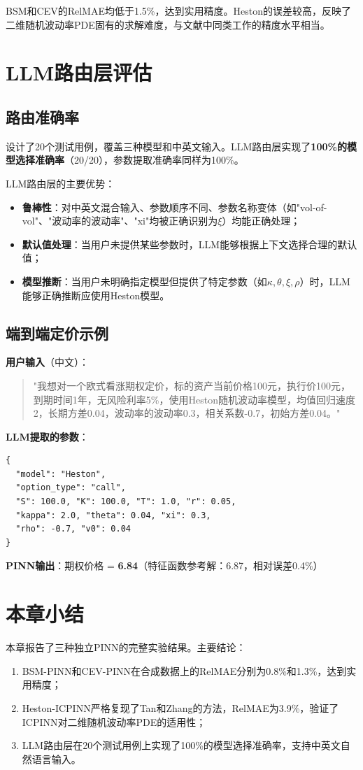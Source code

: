 BSM和CEV的RelMAE均低于1.5\%，达到实用精度。Heston的误差较高，反映了二维随机波动率PDE固有的求解难度，与文献中同类工作的精度水平相当。

\section{LLM路由层评估}\label{sec:llm_eval}

\subsection{路由准确率}

设计了20个测试用例，覆盖三种模型和中英文输入。LLM路由层实现了\textbf{100\%的模型选择准确率}（20/20），参数提取准确率同样为100\%。

LLM路由层的主要优势：
\begin{itemize}
  \item \textbf{鲁棒性}：对中英文混合输入、参数顺序不同、参数名称变体（如"vol-of-vol"、"波动率的波动率"、"xi"均被正确识别为$\xi$）均能正确处理；
  \item \textbf{默认值处理}：当用户未提供某些参数时，LLM能够根据上下文选择合理的默认值；
  \item \textbf{模型推断}：当用户未明确指定模型但提供了特定参数（如$\kappa,\theta,\xi,\rho$）时，LLM能够正确推断应使用Heston模型。
\end{itemize}

\subsection{端到端定价示例}

\textbf{用户输入}（中文）：
\begin{quote}
"我想对一个欧式看涨期权定价，标的资产当前价格100元，执行价100元，到期时间1年，无风险利率5\%，使用Heston随机波动率模型，均值回归速度2，长期方差0.04，波动率的波动率0.3，相关系数-0.7，初始方差0.04。"
\end{quote}

\textbf{LLM提取的参数}：
\begin{verbatim}
{
  "model": "Heston",
  "option_type": "call",
  "S": 100.0, "K": 100.0, "T": 1.0, "r": 0.05,
  "kappa": 2.0, "theta": 0.04, "xi": 0.3,
  "rho": -0.7, "v0": 0.04
}
\end{verbatim}

\textbf{PINN输出}：期权价格 = \textbf{6.84}（特征函数参考解：6.87，相对误差0.4\%）

\section{本章小结}\label{sec:exp_summary}

本章报告了三种独立PINN的完整实验结果。主要结论：
\begin{enumerate}
  \item BSM-PINN和CEV-PINN在合成数据上的RelMAE分别为0.8\%和1.3\%，达到实用精度；
  \item Heston-ICPINN严格复现了Tan和Zhang\citep{guo2024icpinn}的方法，RelMAE为3.9\%，验证了ICPINN对二维随机波动率PDE的适用性；
  \item LLM路由层在20个测试用例上实现了100\%的模型选择准确率，支持中英文自然语言输入。
\end{enumerate}
